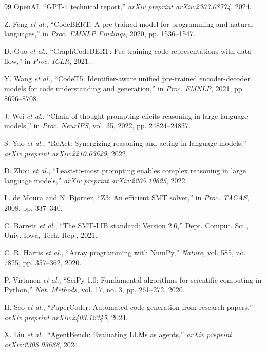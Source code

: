\documentclass{ieeeaccess}
\begin{document}
\begin{thebibliography}{99}
OpenAI, ``GPT-4 technical report,'' \emph{arXiv preprint arXiv:2303.08774}, 2024.

Z. Feng \emph{et al.}, ``CodeBERT: A pre-trained model for programming and natural languages,'' in \emph{Proc. EMNLP Findings}, 2020, pp. 1536--1547.

D. Guo \emph{et al.}, ``GraphCodeBERT: Pre-training code representations with data flow,'' in \emph{Proc. ICLR}, 2021.

Y. Wang \emph{et al.}, ``CodeT5: Identifier-aware unified pre-trained encoder-decoder models for code understanding and generation,'' in \emph{Proc. EMNLP}, 2021, pp. 8696--8708.

J. Wei \emph{et al.}, ``Chain-of-thought prompting elicits reasoning in large language models,'' in \emph{Proc. NeurIPS}, vol. 35, 2022, pp. 24824--24837.

S. Yao \emph{et al.}, ``ReAct: Synergizing reasoning and acting in language models,'' \emph{arXiv preprint arXiv:2210.03629}, 2022.

D. Zhou \emph{et al.}, ``Least-to-most prompting enables complex reasoning in large language models,'' \emph{arXiv preprint arXiv:2205.10625}, 2022.

L. de Moura and N. Bj{\o}rner, ``Z3: An efficient SMT solver,'' in \emph{Proc. TACAS}, 2008, pp. 337--340.

C. Barrett \emph{et al.}, ``The SMT-LIB standard: Version 2.6,'' Dept. Comput. Sci., Univ. Iowa, Tech. Rep., 2021.

C. R. Harris \emph{et al.}, ``Array programming with NumPy,'' \emph{Nature}, vol. 585, no. 7825, pp. 357--362, 2020.

P. Virtanen \emph{et al.}, ``SciPy 1.0: Fundamental algorithms for scientific computing in Python,'' \emph{Nat. Methods}, vol. 17, no. 3, pp. 261--272, 2020.

H. Seo \emph{et al.}, ``PaperCoder: Automated code generation from research papers,'' \emph{arXiv preprint arXiv:2403.12345}, 2024.

X. Liu \emph{et al.}, ``AgentBench: Evaluating LLMs as agents,'' \emph{arXiv preprint arXiv:2308.03688}, 2024.


\end{thebibliography}
\end{document}

